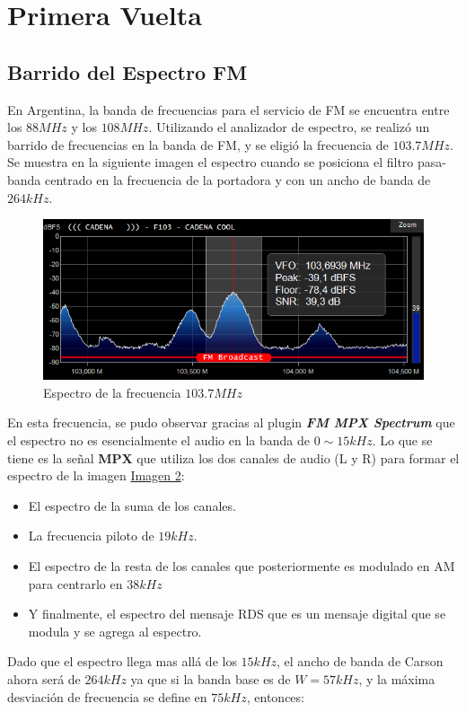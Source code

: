 \section*{Primera Vuelta}
\subsection*{Barrido del Espectro FM}
En Argentina, la banda de frecuencias para el servicio de FM se encuentra entre los $88MHz$ y los $108MHz$. Utilizando el analizador de espectro, se realizó un barrido de frecuencias en la banda de FM, y se eligió la frecuencia de \textbf{$103.7MHz$}. 
Se muestra en la siguiente imagen el espectro cuando se posiciona el filtro pasa-banda centrado en la frecuencia de la portadora y con un ancho de banda de $264kHz$.
\begin{figure}[H]
    \centering
    \includegraphics[width=0.9\columnwidth]{images/1.1-rds-103.4MHz.png}
    \caption{Espectro de la frecuencia $103.7MHz$}
    \label{fig:imagen1}
\end{figure}
En esta frecuencia, se pudo observar gracias al plugin \textbf{\textit{FM MPX Spectrum}} que el espectro no es esencialmente el audio en la banda de $0 \sim 15kHz$. Lo que se tiene es la señal \textbf{MPX} que utiliza los dos canales de audio (L y R) para formar el espectro de la imagen \hyperref[fig:imagen2]{Imagen 2}:
\begin{itemize}
	\item El espectro de la suma de los canales.
	\item La frecuencia piloto de $19kHz$.
	\item El espectro de la resta de los canales que posteriormente es modulado en AM para centrarlo en $38kHz$
	\item Y finalmente, el espectro del mensaje RDS que es un mensaje digital que se modula y se agrega al espectro.
\end{itemize}
Dado que el espectro llega mas allá de los $15kHz$, el ancho de banda de Carson ahora será de $264kHz$ ya que si la banda base es de $W=57kHz$, y la máxima desviación de frecuencia se define en $75kHz$, entonces:
